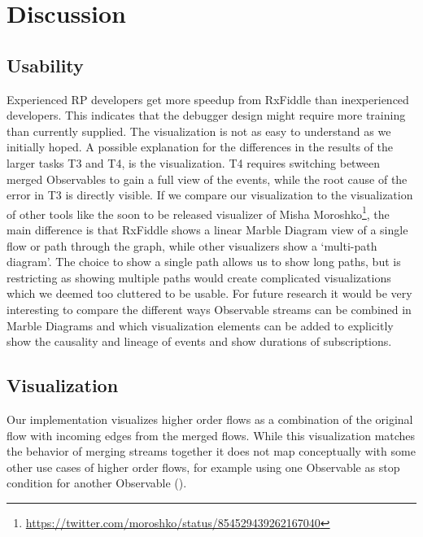 \section{Discussion}
\subsection{Usability}
Experienced RP developers get more speedup from RxFiddle than inexperienced developers. This indicates that the debugger design might require more training than currently supplied. The visualization is not as easy to understand as we initially hoped. A possible explanation for the differences in the results of the larger tasks T3 and T4, is the visualization. T4 requires switching between merged Observables to gain a full view of the events, while the root cause of the error in T3 is directly visible. If we compare our visualization to the visualization of other tools like the soon to be released visualizer of Misha Moroshko\footnote{\url{https://twitter.com/moroshko/status/854529439262167040}}, the main difference is that RxFiddle shows a linear Marble Diagram view of a single flow or path through the graph, while other visualizers show a `multi-path diagram'. The choice to show a single path allows us to show long paths, but is restricting as showing multiple paths would create complicated visualizations which we deemed too cluttered to be usable. For future research it would be very interesting to compare the different ways Observable streams can be combined in Marble Diagrams and which visualization elements can be added to explicitly show the causality and lineage of events and show durations of subscriptions.

\subsection{Visualization}
Our implementation visualizes higher order flows as a combination of the original flow with incoming edges from the merged flows. While this visualization matches the behavior of merging streams together it does not map conceptually with some other use cases of higher order flows, for example using one Observable as stop condition for another Observable ().

